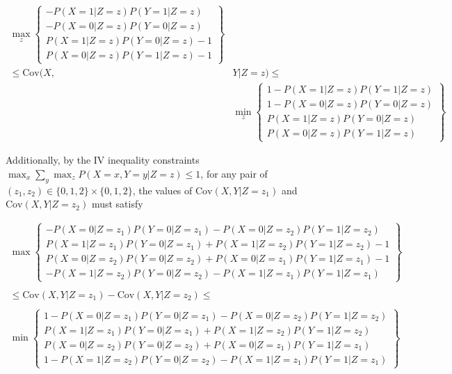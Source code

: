 \documentclass[AMA,STIX1COL,]{WileyNJD-v2}
\begin{document}
\[
\begin{aligned}
  \max_z\left\{
      \begin{array}{c}
        -P(X = 1 | Z = z)P(Y = 1 | Z = z) \\
        -P(X = 0 | Z = z)P(Y = 0 | Z = z) \\
        P(X = 1 | Z = z)P(Y = 0 | Z = z) - 1\\
        P(X = 0 | Z = z)P(Y = 1 | Z = z) - 1
      \end{array}
    \right\} & \\
    \le \text{Cov}(X, &Y | Z = z) \le \\
    &\min_z\left\{
      \begin{array}{c}
        1 - P(X = 1 | Z = z)P(Y = 1 | Z = z) \\
        1 - P(X = 0 | Z = z)P(Y = 0 | Z = z) \\
        P(X = 1 | Z = z)P(Y = 0 | Z = z) \\
        P(X = 0 | Z = z)P(Y = 1 | Z = z)
      \end{array}
    \right\}
\end{aligned}
\]

Additionally, by the IV inequality constraints
\(\max_x \sum_y \max_z P(X = x, Y = y | Z = z) \le 1\), for any pair of
\((z_1, z_2) \in \{0,1,2\} \times \{0,1,2\}\), the values of
\(\text{Cov}(X, Y | Z = z_1)\) and \(\text{Cov}(X, Y | Z = z_2)\) must
satisfy

\[
\begin{aligned}
  \max\left\{
      \begin{array}{c}
        -P(X = 0 | Z = z_1)P(Y = 0 | Z = z_1) - P(X = 0 | Z = z_2)P(Y = 1 | Z = z_2) \\
        P(X = 1 | Z = z_1)P(Y = 0 | Z = z_1) + P(X = 1 | Z = z_2)P(Y = 1 | Z = z_2) -1 \\
        P(X = 0 | Z = z_2)P(Y = 0 | Z = z_2) + P(X = 0 | Z = z_1)P(Y = 1 | Z = z_1) - 1 \\
        -P(X = 1 | Z = z_2)P(Y = 0 | Z = z_2) - P(X = 1 | Z = z_1)P(Y = 1 | Z = z_1)
      \end{array}
    \right\} \qquad \qquad & \\ \\
    \le \text{Cov}(X,Y | Z = z_1) - \text{Cov}(X,Y | Z = z_2) \le \qquad \qquad \qquad \qquad  \qquad& \\ \\
    \min\left\{
      \begin{array}{c}
        1 -P(X = 0 | Z = z_1)P(Y = 0 | Z = z_1) - P(X = 0 | Z = z_2)P(Y = 1 | Z = z_2) \\
        P(X = 1 | Z = z_1)P(Y = 0 | Z = z_1) + P(X = 1 | Z = z_2)P(Y = 1 | Z = z_2) \\
        P(X = 0 | Z = z_2)P(Y = 0 | Z = z_2) + P(X = 0 | Z = z_1)P(Y = 1 | Z = z_1) \\
        1 - P(X = 1 | Z = z_2)P(Y = 0 | Z = z_2) - P(X = 1 | Z = z_1)P(Y = 1 | Z = z_1)
      \end{array}
    \right\} &
\end{aligned}
\]
\end{document}
